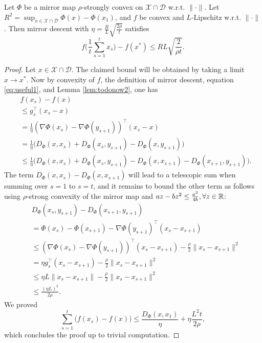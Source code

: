\begin{theorem} \label{th:MD}
Let $\Phi$ be a mirror map $\rho$-strongly convex on $\mathcal{X} \cap \mathcal{D}$ w.r.t. $\|\cdot\|$.
Let $R^2 = \sup_{x \in \mathcal{X} \cap \mathcal{D}} \Phi(x) - \Phi(x_1)$, and $f$ be convex and $L$-Lipschitz w.r.t. $\|\cdot\|$. Then mirror descent with $\eta = \frac{R}{L} \sqrt{\frac{2 \rho}{t}}$ satisfies
$$f\bigg(\frac{1}{t} \sum_{s=1}^t x_s \bigg) - f(x^*) \leq RL \sqrt{\frac{2}{\rho t}} .$$
\end{theorem}

\begin{proof}
Let $x \in \mathcal{X} \cap \mathcal{D}$. The claimed bound will be obtained by taking a limit $x \rightarrow x^*$. Now by convexity of $f$, the definition of mirror descent, equation \eqref{eq:useful1}, and Lemma \ref{lem:todonow2}, one has
\begin{align*}
& f(x_s) - f(x) \\
& \leq g_s^{\top} (x_s - x) \\
& = \frac{1}{\eta} (\nabla \Phi(x_s) - \nabla \Phi(y_{s+1}))^{\top} (x_s - x) \\
& = \frac{1}{\eta} \bigg( D_{\Phi}(x, x_s) + D_{\Phi}(x_s, y_{s+1}) - D_{\Phi}(x, y_{s+1}) \bigg) \\
& \leq \frac{1}{\eta} \bigg( D_{\Phi}(x, x_s) + D_{\Phi}(x_s, y_{s+1}) - D_{\Phi}(x, x_{s+1}) - D_{\Phi}(x_{s+1}, y_{s+1}) \bigg) .
\end{align*}
The term $D_{\Phi}(x, x_s) -  D_{\Phi}(x, x_{s+1})$ will lead to a telescopic sum when summing over $s=1$ to $s=t$, and it remains to bound the other term as follows using $\rho$-strong convexity of the mirror map and $a z - b z^2 \leq \frac{a^2}{4 b}, \forall z \in \mathbb{R}$:
\begin{align*}
& D_{\Phi}(x_s, y_{s+1}) - D_{\Phi}(x_{s+1}, y_{s+1}) \\
& = \Phi(x_s) - \Phi(x_{s+1}) - \nabla \Phi(y_{s+1})^{\top} (x_{s} - x_{s+1}) \\
& \leq (\nabla \Phi(x_s) - \nabla \Phi(y_{s+1}))^{\top} (x_{s} - x_{s+1}) - \frac{\rho}{2} \|x_s - x_{s+1}\|^2 \\
& = \eta g_s^{\top} (x_{s} - x_{s+1}) - \frac{\rho}{2} \|x_s - x_{s+1}\|^2 \\
& \leq \eta L \|x_{s} - x_{s+1}\| - \frac{\rho}{2} \|x_s - x_{s+1}\|^2 \\
& \leq \frac{(\eta L)^2}{2 \rho}.
\end{align*}
We proved 
$$\sum_{s=1}^t \bigg(f(x_s) - f(x)\bigg) \leq \frac{D_{\Phi}(x,x_1)}{\eta} + \eta \frac{L^2 t}{2 \rho},$$
which concludes the proof up to trivial computation.
\end{proof}

